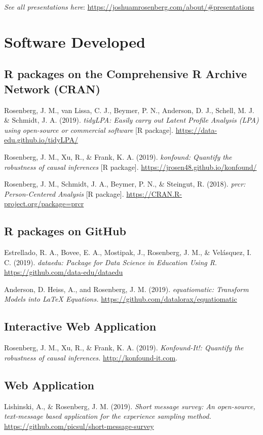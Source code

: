 \documentclass[11pt, a4paper]{awesome-cv}
\begin{document}
\emph{See all presentations here}: \url{https://joshuamrosenberg.com/about/\#presentations}

\hypertarget{software-developed}{%
\section{Software Developed}\label{software-developed}}

\hypertarget{r-packages-on-the-comprehensive-r-archive-network-cran}{%
\subsection{R packages on the Comprehensive R Archive Network (CRAN)}\label{r-packages-on-the-comprehensive-r-archive-network-cran}}

Rosenberg, J. M., van Lissa, C. J., Beymer, P. N., Anderson, D. J., Schell, M. J. \& Schmidt, J. A. (2019). \emph{tidyLPA: Easily carry out Latent Profile Analysis (LPA) using open-source or commercial software} {[}R package{]}. \url{https://data-edu.github.io/tidyLPA/}

Rosenberg, J. M., Xu, R., \& Frank, K. A. (2019). \emph{konfound: Quantify the robustness of causal inferences} {[}R package{]}. \url{https://jrosen48.github.io/konfound/}

Rosenberg, J. M., Schmidt, J. A., Beymer, P. N., \& Steingut, R. (2018). \emph{prcr: Person-Centered Analysis} {[}R package{]}. \url{https://CRAN.R-project.org/package=prcr}

\hypertarget{r-packages-on-github}{%
\subsection{R packages on GitHub}\label{r-packages-on-github}}

Estrellado, R. A., Bovee, E. A., Mostipak, J., Rosenberg, J. M., \& Velásquez, I. C. (2019). \emph{dataedu: Package for Data Science in Education Using R}. \url{https://github.com/data-edu/dataedu}

Anderson, D. Heiss, A., and Rosenberg, J. M. (2019). \emph{equatiomatic: Transform Models into LaTeX Equations.} \url{https://github.com/datalorax/equatiomatic}

\hypertarget{interactive-web-application}{%
\subsection{Interactive Web Application}\label{interactive-web-application}}

Rosenberg, J. M., Xu, R., \& Frank, K. A. (2019). \emph{Konfound-It!: Quantify the robustness of causal inferences.} \url{http://konfound-it.com}.

\hypertarget{web-application}{%
\subsection{Web Application}\label{web-application}}

Lishinski, A., \& Rosenberg, J. M. (2019). \emph{Short message survey: An open-source, text-message based application for the experience sampling method.} \url{https://github.com/picsul/short-message-survey}
\end{document}
